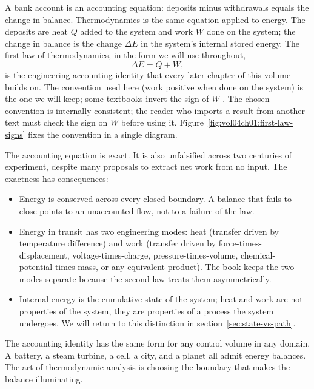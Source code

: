 A bank account is an accounting equation: deposits minus withdrawals
equals the change in balance. Thermodynamics is the same equation
applied to energy. The deposits are heat $Q$ added to the system and
work $W$ done on the system; the change in balance is the change
$\Delta E$ in the system's internal stored energy. The first law of
thermodynamics, in the form we will use throughout,
\[
\Delta E = Q + W,
\]
is the engineering accounting identity that every later chapter of
this volume builds on. The convention used here (work positive when
done on the system) is the one we will keep; some textbooks invert
the sign of $W$ \cite[ch.~2]{text:cengel-boles}. The chosen convention
is internally consistent; the reader who imports a result from another
text must check the sign on $W$ before using it.
Figure~\ref{fig:vol04ch01:first-law-signs} fixes the convention in a
single diagram.



The accounting equation is exact. It is also unfalsified across two
centuries of experiment, despite many proposals to extract net work
from no input. The exactness has consequences:

\begin{itemize}[leftmargin=*]
  \item Energy is conserved across every closed boundary. A balance
    that fails to close points to an unaccounted flow, not to a
    failure of the law.
  \item Energy in transit has two engineering modes: heat (transfer
    driven by temperature difference) and work (transfer driven by
    force-times-displacement, voltage-times-charge, pressure-times-volume,
    chemical-potential-times-mass, or any equivalent product). The
    book keeps the two modes separate because the second law treats
    them asymmetrically.
  \item Internal energy is the cumulative state of the system; heat
    and work are not properties of the system, they are properties of
    a process the system undergoes. We will return to this distinction
    in section~\ref{sec:state-vs-path}.
\end{itemize}

The accounting identity has the same form for any control volume in
any domain. A battery, a steam turbine, a cell, a city, and a planet
all admit energy balances. The art of thermodynamic analysis is
choosing the boundary that makes the balance illuminating.

